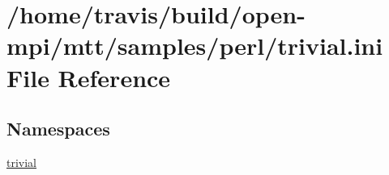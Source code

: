 \hypertarget{trivial_8ini}{\section{/home/travis/build/open-\/mpi/mtt/samples/perl/trivial.ini File Reference}
\label{trivial_8ini}
}
\subsection*{Namespaces}
\begin{DoxyCompactItemize}
\item 
\hyperlink{namespacetrivial}{trivial}
\end{DoxyCompactItemize}
